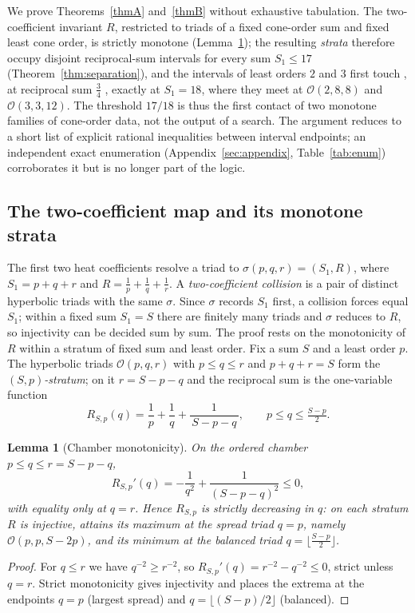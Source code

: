 \documentclass[12pt, letterpaper]{article}
\theoremstyle{definition}
\theoremstyle{plain}
\newtheorem{lemma}[theorem]{Lemma}
\begin{document}
We prove Theorems~\ref{thmA} and~\ref{thmB} without exhaustive tabulation. The two-coefficient invariant $R$, restricted to triads of a fixed cone-order sum and fixed least cone order, is strictly monotone (Lemma~\ref{lem:chamber}); the resulting \emph{strata} therefore occupy disjoint reciprocal-sum intervals for every sum $S_1\le17$ (Theorem~\ref{thm:separation}), and the intervals of least orders $2$ and $3$ first touch ,  at reciprocal sum $\tfrac34$ ,  exactly at $S_1=18$, where they meet at $\mathcal{O}(2,8,8)$ and $\mathcal{O}(3,3,12)$. The threshold $17/18$ is thus the first contact of two monotone families of cone-order data, not the output of a search. The argument reduces to a short list of explicit rational inequalities between interval endpoints; an independent exact enumeration (Appendix~\ref{sec:appendix}, Table~\ref{tab:enum}) corroborates it but is no longer part of the logic.

\subsection{The two-coefficient map and its monotone strata}

The first two heat coefficients resolve a triad to $\sigma(p,q,r)=(S_1,R)$, where $S_1=p+q+r$ and $R=\tfrac1p+\tfrac1q+\tfrac1r$. A \emph{two-coefficient collision} is a pair of distinct hyperbolic triads with the same $\sigma$. Since $\sigma$ records $S_1$ first, a collision forces equal $S_1$; within a fixed sum $S_1=S$ there are finitely many triads and $\sigma$ reduces to $R$, so injectivity can be decided sum by sum. The proof rests on the monotonicity of $R$ within a stratum of fixed sum and least order. Fix a sum $S$ and a least order $p$. The hyperbolic triads $\mathcal{O}(p,q,r)$ with $p\le q\le r$ and $p+q+r=S$ form the \emph{$(S,p)$-stratum}; on it $r=S-p-q$ and the reciprocal sum is the one-variable function
\[
    R_{S,p}(q)=\frac1p+\frac1q+\frac1{\,S-p-q\,},\qquad p\le q\le\tfrac{S-p}{2}.
\]

\begin{lemma}[Chamber monotonicity]\label{lem:chamber}
On the ordered chamber $p\le q\le r=S-p-q$,
\[
    R_{S,p}'(q)=-\frac1{q^2}+\frac1{(S-p-q)^2}\le0,
\]
with equality only at $q=r$. Hence $R_{S,p}$ is strictly decreasing in $q$: on each stratum $R$ is injective, attains its maximum at the spread triad $q=p$, namely $\mathcal{O}(p,p,S-2p)$, and its minimum at the balanced triad $q=\lfloor\tfrac{S-p}2\rfloor$.
\end{lemma}
\begin{proof}
For $q\le r$ we have $q^{-2}\ge r^{-2}$, so $R_{S,p}'(q)=r^{-2}-q^{-2}\le0$, strict unless $q=r$. Strict monotonicity gives injectivity and places the extrema at the endpoints $q=p$ (largest spread) and $q=\lfloor(S-p)/2\rfloor$ (balanced).
\end{proof}
\end{document}
